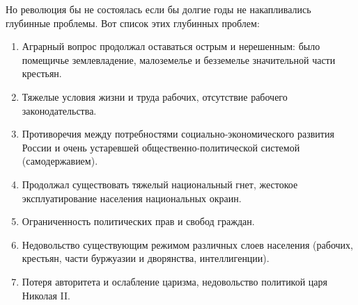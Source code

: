 \documentclass[12pt]{article}
\newcommand{\red}[1]{{\color{red}{#1}}}
\newcommand{\teal}[1]{{\color{teal}{#1}}}
\begin{document}
  Но революция бы не состоялась если бы долгие годы не накапливались глубинные проблемы.
  Вот список этих глубинных проблем:
  \begin{enumerate}
    \item Аграрный вопрос продолжал оставаться острым и нерешенным: было помещичье землевладение, малоземелье и безземелье значительной части крестьян.
    \item Тяжелые условия жизни и труда рабочих, отсутствие рабочего законодательства.
    \item Противоречия между потребностями социально-экономического развития России и очень устаревшей общественно-политической системой (самодержавием).
    \item Продолжал существовать тяжелый национальный гнет, жестокое эксплуатирование населения национальных окраин.
    \item Ограниченность политических прав и свобод граждан.
    \item Недовольство существующим режимом различных слоев населения (рабочих, крестьян, части буржуазии и дворянства, интеллигенции).
    \item Потеря авторитета и ослабление царизма, недовольство политикой царя Николая II.
  \end{enumerate}
\end{document}
